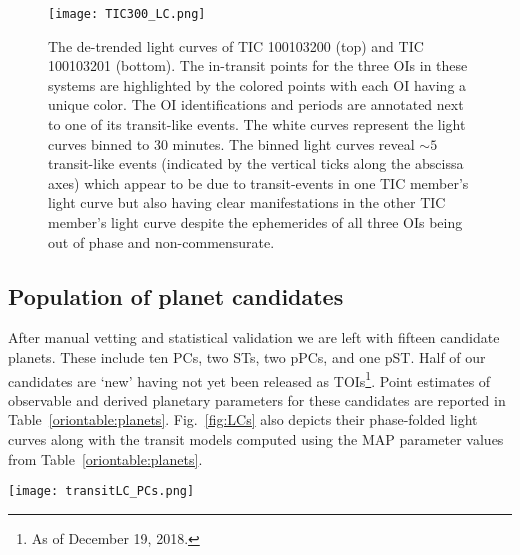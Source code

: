 \begin{figure}
  \centering
  \texttt{[image: TIC300\_LC.png]}
  \caption{The de-trended light curves of TIC 100103200 (top) and TIC 100103201 (bottom).
    The in-transit points for the three
    OIs in these systems are highlighted by the colored points with each OI having a unique color.
    The OI identifications and periods are annotated next to one of its transit-like events.
    The white curves represent the light curves binned to 30 minutes. The binned light curves reveal
    $\sim 5$ transit-like events (indicated by the vertical ticks along the abscissa axes) which appear to be
    due to transit-events in one TIC member's light curve but also having clear manifestations in the other
    TIC member's light curve despite the ephemerides of all three OIs being out of phase and non-commensurate.}
  \label{fig:tic300}
\end{figure}

\subsection{Population of planet candidates}
After manual vetting and statistical validation we are left with fifteen candidate planets. These include
ten PCs, two STs, two pPCs, and one pST. Half of our candidates are `new' having not yet been released
as TOIs\footnote{As of December 19, 2018.}.
Point estimates of observable and derived planetary parameters for these candidates are reported in
Table~\ref{oriontable:planets}.  Fig.~\ref{fig:LCs} also depicts their phase-folded light curves along with
the transit models computed using the MAP parameter values from Table~\ref{oriontable:planets}. \\



\begin{figure*}
  \centering
  \texttt{[image: transitLC\_PCs.png]}
  \caption{Phase-folded transit light curves for our set of 15 planet candidates. The temporal binning and axes
    ranges for each candidate are chosen to optimize visual clarity. The marker colors for each candidate's binned
    light curve is indicative of its disposition which also is annotated in the upper
    right of its panel. Candidates detected by \pipeline{} which are also \tess{} Objects of Interest 
    have their TOI ID annotated in the upper left.}
  \label{fig:LCs}
\end{figure*}

